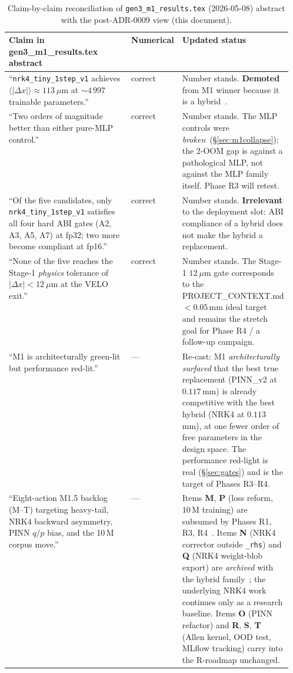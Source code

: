 \documentclass[11pt,a4paper]{article}
\begin{document}
\begin{table}[h!]
\centering
\caption{Claim-by-claim reconciliation of
\texttt{gen3\_m1\_results.tex} (2026-05-08) abstract with the
post-ADR-0009 view (this document).}
\label{tab:reconcile}
\small
\renewcommand{\arraystretch}{1.2}
\begin{tabularx}{\linewidth}{p{0.46\linewidth}p{0.10\linewidth}Y}
\toprule
Claim in gen3\_m1\_results.tex abstract & Numerical & Updated status \\
\midrule
``\texttt{nrk4\_tiny\_1step\_v1} achieves
$\langle|\Delta x|\rangle\!\approx\!113~\mu$m at $\sim\!4\,997$
trainable parameters.''
   & correct
   & Number stands. \textbf{Demoted} from M1 winner because it is a
     hybrid~\cite{adr0009}. \\
``Two orders of magnitude better than either pure-MLP control.''
   & correct
   & Number stands. The MLP controls were
     \emph{broken}~(\S\ref{sec:m1collapse}); the 2-OOM gap is
     against a pathological MLP, not against the MLP family
     itself. Phase R3 will retest. \\
``Of the five candidates, only \texttt{nrk4\_tiny\_1step\_v1}
satisfies all four hard ABI gates (A2, A3, A5, A7) at fp32; two more
become compliant at fp16.''
   & correct
   & Number stands. \textbf{Irrelevant} to the deployment slot:
     ABI compliance of a hybrid does not make the hybrid a
     replacement. \\
``None of the five reaches the Stage-1 \emph{physics} tolerance of
$|\Delta x|<12~\mu$m at the VELO exit.''
   & correct
   & Number stands. The Stage-1 $12~\mu$m gate corresponds to the
     PROJECT\_CONTEXT.md $<0.05$\,mm ideal target~\cite{projectcontext}
     and remains the stretch goal for Phase R4 / a follow-up
     campaign. \\
``M1 is architecturally green-lit but performance red-lit.''
   & ---
   & Re-cast: M1 \emph{architecturally surfaced} that the best true
     replacement (PINN\_v2 at $0.117$\,mm) is already competitive
     with the best hybrid (NRK4 at $0.113$\,mm), at one fewer order
     of free parameters in the design space. The performance
     red-light is real (\S\ref{sec:gates}) and is the target of
     Phases R3--R4. \\
``Eight-action M1.5 backlog (M--T) targeting heavy-tail, NRK4
backward asymmetry, PINN $q/p$ bias, and the 10\,M corpus move.''
   & ---
   & Items \textbf{M}, \textbf{P} (loss reform, 10\,M training) are
     subsumed by Phases R1, R3, R4~\cite{replacementplan}.
     Items \textbf{N} (NRK4 corrector outside \texttt{\_rhs}) and
     \textbf{Q} (NRK4 weight-blob export) are \emph{archived} with
     the hybrid family~\cite{cleanuplist}; the underlying NRK4
     work continues only as a research baseline. Items
     \textbf{O} (PINN refactor) and \textbf{R}, \textbf{S},
     \textbf{T} (Allen kernel, OOD test, MLflow tracking) carry
     into the R-roadmap unchanged. \\
\bottomrule
\end{tabularx}
\end{table}
\end{document}
